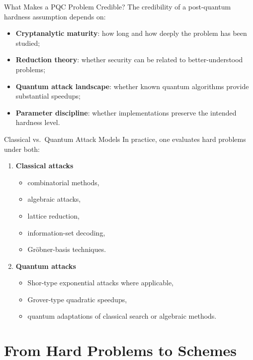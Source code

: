\documentclass[aspectratio=169]{beamer}
\begin{document}
	\begin{frame}{What Makes a PQC Problem Credible?}
		The credibility of a post-quantum hardness assumption depends on:
		\begin{itemize}
			\item \textbf{Cryptanalytic maturity}: how long and how deeply the problem has been studied;
			\item \textbf{Reduction theory}: whether security can be related to better-understood problems;
			\item \textbf{Quantum attack landscape}: whether known quantum algorithms provide substantial speedups;
			\item \textbf{Parameter discipline}: whether implementations preserve the intended hardness level.
		\end{itemize}
	\end{frame}
	
	\begin{frame}{Classical vs.\ Quantum Attack Models}
		In practice, one evaluates hard problems under both:
		\begin{enumerate}
			\item \textbf{Classical attacks}
			\begin{itemize}
				\item combinatorial methods,
				\item algebraic attacks,
				\item lattice reduction,
				\item information-set decoding,
				\item Gröbner-basis techniques.
			\end{itemize}
			\item \textbf{Quantum attacks}
			\begin{itemize}
				\item Shor-type exponential attacks where applicable,
				\item Grover-type quadratic speedups,
				\item quantum adaptations of classical search or algebraic methods.
			\end{itemize}
		\end{enumerate}
	\end{frame}
	
	\section{From Hard Problems to Schemes}
	
\end{document}
